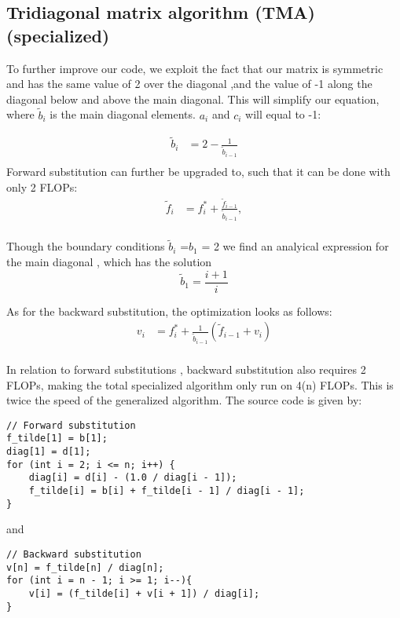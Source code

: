 \documentclass{article}
\begin{document}
\subsection{Tridiagonal matrix algorithm (TMA) (specialized)}
To further improve our code, we exploit the fact that our matrix is symmetric and has the same value of 2 over the diagonal ,and the value of -1 along the diagonal below and above the main diagonal. This will simplify our equation, where  $\tilde{b}_i$ is the main diagonal elements. ${a}_i$  and ${c}_i$ will equal to -1:

\begin{align*}
  \tilde{b}_i &= 2 - \frac{1}{\tilde{b}_{i-1}} \\
\end{align*}
 Forward substitution can further be upgraded to, such that it can be done with only 2 FLOPs:\\
\begin{align*}
  \tilde{f}_i &= f^{*}_i + \frac{\tilde{f}_{i-1}}{\tilde{b}_{i-1}},  \\
\end{align*}

Though the boundary conditions  $\tilde{b}_i$ =${b}_1$ = 2 we find an analyical expression for the main diagonal , which has the solution
\begin{equation*}
\tilde{b}_1 = \frac{i+1}{i}
\end{equation*}

As for the backward substitution, the optimization looks as follows:
\begin{align*}
  {v}_i &= f^{*}_i + \frac{1}{\tilde{b}_{i-1}}(\tilde{f}_{i-1} + {v}_i)  \\
\end{align*}

In relation to forward substitutions , backward substitution also requires 2 FLOPs, making the total specialized algorithm only run on 4(n) FLOPs. This is twice the speed of the generalized algorithm.
\newline\newline
The source code is given by:
\begin{lstlisting}
// Forward substitution
f_tilde[1] = b[1];
diag[1] = d[1];
for (int i = 2; i <= n; i++) {
    diag[i] = d[i] - (1.0 / diag[i - 1]);
    f_tilde[i] = b[i] + f_tilde[i - 1] / diag[i - 1];
}
\end{lstlisting}
and
\begin{lstlisting}
// Backward substitution
v[n] = f_tilde[n] / diag[n];
for (int i = n - 1; i >= 1; i--){
    v[i] = (f_tilde[i] + v[i + 1]) / diag[i];
}
\end{lstlisting}
\end{document}
